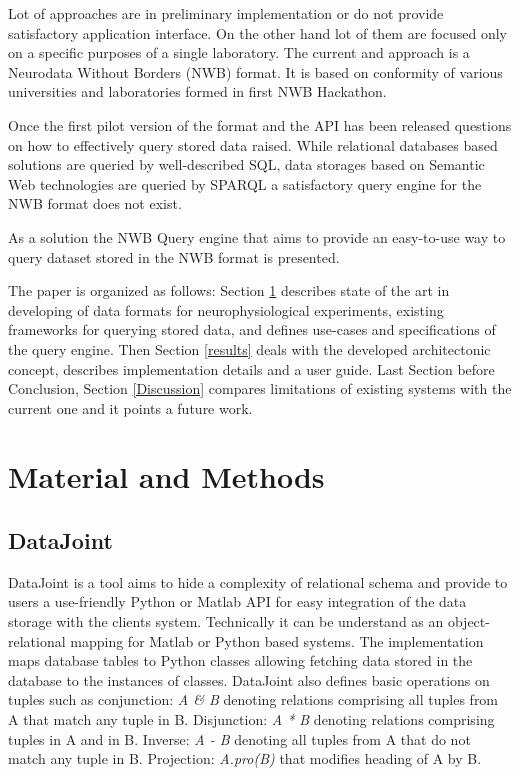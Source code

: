 \documentclass[utf8]{frontiersSCNS} %
\begin{document}
Lot of approaches are in preliminary implementation or do not provide satisfactory application interface. On the other hand lot of them are focused only on a specific purposes of a single laboratory. The current and approach is a Neurodata Without Borders (NWB) format. It is based on conformity of various universities and laboratories formed in first NWB Hackathon.

Once the first pilot version of the format and the API has been released \citep{teeters-neuron} questions on how to effectively query stored data raised. While relational databases based solutions are queried by well-described SQL, data storages based on Semantic Web technologies are queried by SPARQL \citep{prudhommeaux2008sparql} a satisfactory query engine for the NWB format does not exist.

As a solution the NWB Query engine that aims to provide an easy-to-use way to query dataset stored in the NWB format is presented.

The paper is organized as follows: Section \ref{materials_and_methods} describes state of the art in developing of data formats for neurophysiological experiments, existing frameworks for querying stored data, and defines use-cases and specifications of the query engine. Then Section \ref{results} deals with the developed architectonic concept, describes implementation details and a user guide. Last Section before Conclusion, Section \ref{Discussion} compares limitations of existing systems with the current one and it points a future work.


\section{Material and Methods}
\label{materials_and_methods}

\subsection{DataJoint}
\label{DataJoint}

DataJoint \citep{Yatsenko031658} is a tool aims to hide a complexity of relational schema and provide to users a use-friendly Python or Matlab API for easy integration of the data storage with the clients system. Technically it can be understand as an object-relational mapping \citep{Keith2010} for Matlab or Python based systems. The implementation maps database tables to Python classes allowing fetching data stored in the database to the instances of classes. DataJoint also defines basic operations on tuples such as conjunction: \emph{A \& B} denoting relations comprising all tuples from A that match any tuple in B. Disjunction: \emph{A * B} denoting relations comprising tuples in A and in B. Inverse: \emph{A - B} denoting all tuples from A that do not match any tuple in B. Projection: \emph{A.pro(B)} that modifies heading of A by B.
\end{document}
